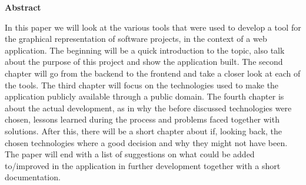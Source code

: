 \newpage

\vspace*{1cm}

\begin{center}
    \textbf{Abstract}
\end{center}

\vspace*{1cm}

\noindent
In this paper we will look at the various tools that were used to develop a tool for the graphical representation of software projects, in the context of a web application. The beginning will be a quick introduction to the topic, also talk about the purpose of this project and show the application built. The second chapter will go from the backend to the frontend and take a closer look at each of the tools. The third chapter will focus on the technologies used to make the application publicly available through a public domain. The fourth chapter is about the actual development, as in why the before discussed technologies were chosen, lessons learned during the process and problems faced together with solutions. After this, there will be a short chapter about if, looking back, the chosen technologies where a good decision and why they might not have been. The paper will end with a list of suggestions on what could be added to/improved in the application in further development together with a short documentation.
